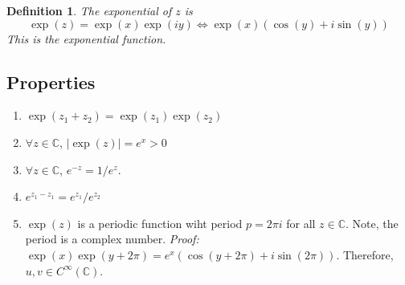 \documentclass{article}
\newtheorem{definition}[theorem]{Definition}
\newtheorem{one minute paper}[theorem]{One Minute Paper}
\begin{document}
\begin{definition}
    The exponential of $z$ is 
    \begin{equation}
        \exp(z) = \exp(x)\exp(iy) \iff \exp(x)\left( \cos(y) + i\sin(y) \right)
    \end{equation}
    This is the exponential function.
\end{definition}

\subsection*{Properties}

\begin{enumerate}
    \item $\exp(z_1 + z_2) = \exp(z_1)\exp(z_2)$
    \item $\forall z \in \mathbb{C}$, $|\exp(z)| = e^x > 0$
    \item $\forall z \in \mathbb{C}$, $e^{-z} = 1/e^{z}$. 
    \item $e^{z_1 - z_1} = e^{z_1}/e^{z_2}$
    \item $\exp(z)$ is a periodic function wiht period $p = 2\pi i$ for all $z \in \mathbb{C}$. Note, the period is a complex number.
    \textit{Proof:} $\exp(x)\exp(y + 2\pi) = e^x(\cos(y + 2\pi) + i\sin(2\pi))$. Therefore, $u,v \in C^{\infty}(\mathbb{C})$. 
\end{enumerate}
\end{document}
